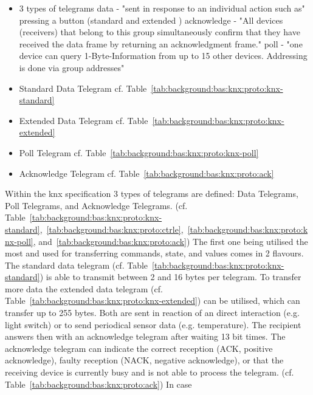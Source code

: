 	\begin{itemize}
		\item 3 types of telegrams \parencite{Hubner2009} \parencite{Merz2009}
			\subitem data - "sent in response to an individual action such as" \parencite{Merz2009} pressing a button (standard and extended \parencite{Hubner2009})
			\subitem acknowledge - "All devices (receivers) that belong to this group simultaneously confirm that they have received the data frame by returning an acknowledgment frame." \parencite{Merz2009}
			\subitem poll - "one device can query 1-Byte-Information from up to 15 other devices. Addressing is done via group addresses" \parencite{Hubner2009}
		\item Standard Data Telegram
			\subitem cf. Table~\ref{tab:background:bas:knx:proto:knx-standard}
		\item Extended Data Telegram
			\subitem cf. Table~\ref{tab:background:bas:knx:proto:knx-extended}
		\item Poll Telegram
			\subitem cf. Table~\ref{tab:background:bas:knx:proto:knx-poll}
		\item Acknowledge Telegram
			\subitem cf. Table~\ref{tab:background:bas:knx:proto:ack}
		
	\end{itemize}

Within the \gls{knx} specification 3 types of telegrams are defined: Data Telegrams, Poll Telegrams, and Acknowledge Telegrams. (cf. Table~\ref{tab:background:bas:knx:proto:knx-standard},~\ref{tab:background:bas:knx:proto:ctrle},~\ref{tab:background:bas:knx:proto:knx-poll}, and~\ref{tab:background:bas:knx:proto:ack})
The first one being utilised the most and used for transferring commands, state, and values comes in 2 flavours. The standard data telegram (cf. Table~\ref{tab:background:bas:knx:proto:knx-standard}) is able to transmit between 2 and 16 bytes per telegram. To transfer more data the extended data telegram (cf. Table~\ref{tab:background:bas:knx:proto:knx-extended}) can be utilised, which can transfer up to 255 bytes.
Both are sent in reaction of an direct interaction (e.g. light switch) or to send periodical sensor data (e.g. temperature). \parencite{Merz2009}
The recipient answers then with an acknowledge telegram after waiting 13 bit times. The acknowledge telegram can indicate the correct reception (ACK, positive acknowledge), faulty reception (NACK, negative acknowledge), or that the receiving device is currently busy and is not able to process the telegram. (cf. Table~\ref{tab:background:bas:knx:proto:ack})
In case 


